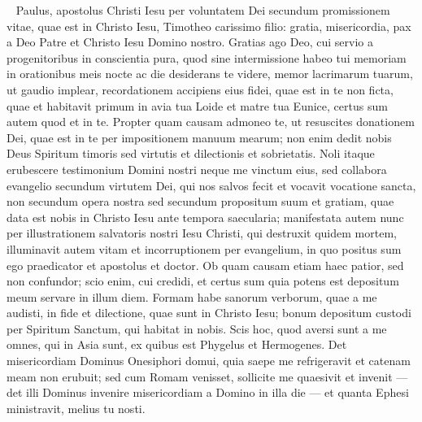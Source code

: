
\begin{biblechapter}  
\verse Paulus, apostolus Christi Iesu per voluntatem Dei secundum promissionem vitae, quae est in Christo Iesu, 
\verse Timotheo carissimo filio: gratia, misericordia, pax a Deo Patre et Christo Iesu Domino nostro. 
\verse Gratias ago Deo, cui servio a progenitoribus in conscientia pura, quod sine intermissione habeo tui memoriam in orationibus meis nocte ac die 
\verse desiderans te videre, memor lacrimarum tuarum, ut gaudio implear, 
\verse recordationem accipiens eius fidei, quae est in te non ficta, quae et habitavit primum in avia tua Loide et matre tua Eunice, certus sum autem quod et in te. 
\verse Propter quam causam admoneo te, ut resuscites donationem Dei, quae est in te per impositionem manuum mearum; 
\verse non enim dedit nobis Deus Spiritum timoris sed virtutis et dilectionis et sobrietatis. 
\verse Noli itaque erubescere testimonium Domini nostri neque me vinctum eius, sed collabora evangelio secundum virtutem Dei, 
\verse qui nos salvos fecit et vocavit vocatione sancta, non secundum opera nostra sed secundum propositum suum et gratiam, quae data est nobis in Christo Iesu ante tempora saecularia; 
\verse manifestata autem nunc per illustrationem salvatoris nostri Iesu Christi, qui destruxit quidem mortem, illuminavit autem vitam et incorruptionem per evangelium, 
\verse in quo positus sum ego praedicator et apostolus et doctor. 
\verse Ob quam causam etiam haec patior, sed non confundor; scio enim, cui credidi, et certus sum quia potens est depositum meum servare in illum diem. 
\verse Formam habe sanorum verborum, quae a me audisti, in fide et dilectione, quae sunt in Christo Iesu; 
\verse bonum depositum custodi per Spiritum Sanctum, qui habitat in nobis. 
\verse Scis hoc, quod aversi sunt a me omnes, qui in Asia sunt, ex quibus est Phygelus et Hermogenes. 
\verse Det misericordiam Dominus Onesiphori domui, quia saepe me refrigeravit et catenam meam non erubuit; 
\verse sed cum Romam venisset, sollicite me quaesivit et invenit 
\verse — det illi Dominus invenire misericordiam a Domino in illa die — et quanta Ephesi ministravit, melius tu nosti. 
\end{biblechapter}

